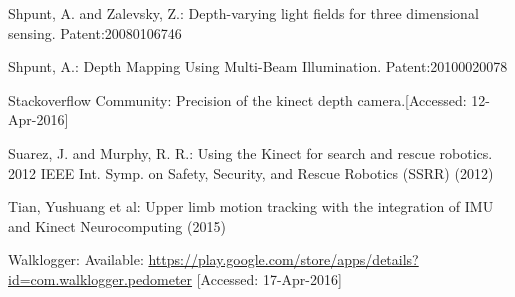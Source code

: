 \documentclass{llncs}
\begin{document}
\begin{thebibliography}{5}
	Shpunt, A. and Zalevsky, Z.:
	Depth-varying light fields for three dimensional sensing.
	Patent:20080106746
					
	Shpunt, A.:
	Depth Mapping Using Multi-Beam Illumination.
	Patent:20100020078
	
	Stackoverflow Community:
	Precision of the kinect depth camera.[Accessed: 12-Apr-2016]
	
	Suarez, J. and Murphy, R. R.:
	Using the Kinect for search and rescue robotics.
	2012 IEEE Int. Symp. on Safety, Security, and Rescue Robotics (SSRR) (2012)
				
	Tian, Yushuang et al:
	Upper limb motion tracking with the integration of IMU and Kinect
	Neurocomputing (2015)
		
	Walklogger:
	Available: \url{https://play.google.com/store/apps/details?id=com.walklogger.pedometer} [Accessed: 17-Apr-2016]
		
\end{thebibliography}
\end{document}
